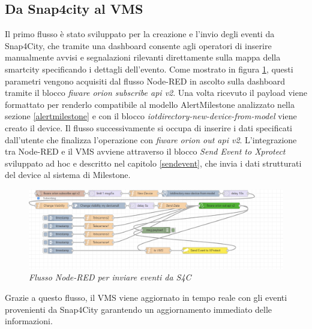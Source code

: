 \documentclass[a4paper, openright, thesis]{report}
\begin{document}
\subsection{Da Snap4city al VMS}
Il primo flusso è stato sviluppato per la creazione e l'invio degli eventi da Snap4City, che tramite una dashboard consente agli operatori di inserire manualmente avvisi e segnalazioni rilevanti direttamente sulla mappa della smartcity specificando i dettagli dell'evento. Come mostrato in figura \ref{14}, questi parametri vengono acquisiti dal flusso Node-RED in ascolto sulla dashboard tramite il  blocco \textit{fiware orion subscribe api v2}. Una volta ricevuto il payload viene formattato per renderlo compatibile al modello AlertMilestone analizzato nella sezione \ref{alertmilestone} e con il blocco \textit{iotdirectory-new-device-from-model} viene creato il device. Il flusso successivamente si occupa di inserire i dati specificati dall'utente che finalizza l'operazione con \textit{fiware orion out api v2}.
L'integrazione tra Node-RED e il VMS avviene attraverso il blocco \textit{Send Event to Xprotect} sviluppato ad hoc e descritto nel capitolo \ref{sendevent}, che invia i dati strutturati del device al sistema di Milestone.

\begin{figure}[H]
    \centering
    \includegraphics[width=1\linewidth]{img/S4CtoVMS.png}
    \caption{\textit{Flusso Node-RED per inviare eventi da S4C}}
    \label{14}
\end{figure}
\noindent
Grazie a questo flusso, il VMS viene aggiornato in tempo reale con gli eventi provenienti da Snap4City garantendo un aggiornamento immediato delle informazioni.
\end{document}

